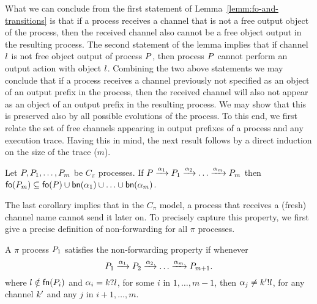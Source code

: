 What we can conclude from the first statement of Lemma~\ref{lemm:fo-and-transitions} is that if a process receives a channel that is not a free output object of the process, then the received channel also cannot be a free object output in the resulting process. The second statement of the lemma implies that if channel $l$ is not free object output of process $P$, then process $P$ cannot perform an output action with object $l$.  
%
%
%
Combining the two above statements we may conclude that if a process receives a channel previously not specified as an object of an output prefix in the process, then the received channel will also not appear as an object of an output prefix in the resulting process. We may show that this is preserved also by all possible evolutions of the process. To this end, we first relate the set of free channels appearing in output prefixes of a process and any execution trace. Having this in mind, the next result follows by a direct induction on the size of the trace ($m$). %


\begin{corollary}\label{cor:trace-fo}
Let $P, P_1,\ldots, P_m$ be $C_\pi$ processes. If $P\xrightarrow{\alpha_1}P_1\xrightarrow{\alpha_2}\ldots\xrightarrow{\alpha_m}P_m$ then $\mathsf{fo}(P_m)\subseteq\mathsf{fo}(P)\cup\mathsf{bn}(\alpha_1)\cup\ldots\cup\mathsf{bn}(\alpha_m)$.
\end{corollary}

The last corollary implies that in the $C_\pi$ model, a process that receives a (fresh) channel name cannot send it later on. To precisely capture this property, we first give a precise definition of non-forwarding for all $\pi$ processes.

\begin{definition}\label{def:non-leaking-pi-processes}
A $\pi$ process $P_1$ satisfies the non-forwarding %
property if whenever 
\[
P_1\xrightarrow{\alpha_1}P_2\xrightarrow{\alpha_2}\ldots\xrightarrow{\alpha_{m}}P_{m+1}.
\]
where $l\notin\mathsf{fn}(P_i)$ and $\alpha_i=k?l$, for some $i$ in $1, \ldots, m-1$, then $\alpha_j\not=k'!l$, for any channel $k'$ and any $j$ in $i+1, \ldots,m$.
\end{definition}

